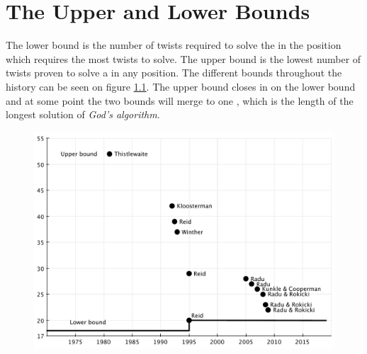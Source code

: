 \chapter{The Upper and Lower Bounds}
The lower bound is the number of twists required to solve the \rubik{} in the position which requires the most twists to solve.
The upper bound is the lowest number of twists proven to solve a \rubik{} in any position.
The different bounds throughout the history can be seen on figure \ref{fig:upperLowerBound}.
The upper bound closes in on the lower bound and at some point the two bounds will merge to one \cite{rokicki09}, which is the length of the longest solution of \textit{God's algorithm}.

\begin{figure}[ht]
	\centering
		\includegraphics[scale = 0.5]{input/pics/bounds2.pdf}
	\caption{}
	\label{fig:upperLowerBound}
\end{figure}


\label{sec:bounds}


